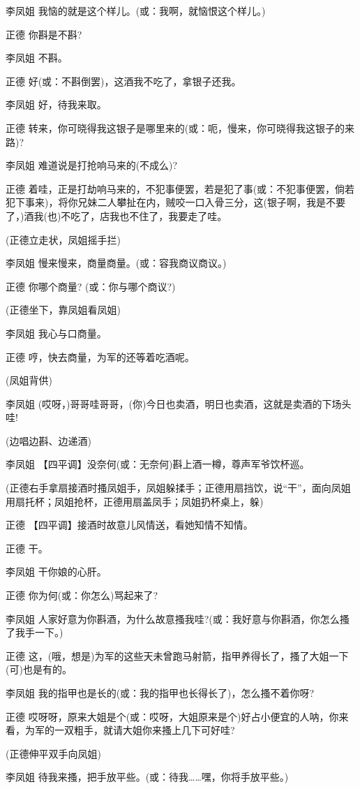 李凤姐 我恼的就是这个样儿。(或：我啊，就恼恨这个样儿。)

正德 你斟是不斟?

李凤姐 不斟。

正德 好(或：不斟倒罢)，这酒我不吃了，拿银子还我。

李凤姐 好，待我来取。

正德
转来，你可晓得我这银子是哪里来的(或：呃，慢来，你可晓得我这银子的来路)?

李凤姐 难道说是打抢响马来的(不成么)?

正德
着哇，正是打劫响马来的，不犯事便罢，若是犯了事(或：不犯事便罢，倘若犯下事来)，将你兄妹二人攀扯在内，贼咬一口入骨三分，这(银子啊，我是不要了，)酒我(也)不吃了，店我也不住了，我要走了哇。

(正德立走状，凤姐摇手拦)

李凤姐 慢来慢来，商量商量。(或：容我商议商议。)

正德 你哪个商量? (或：你与哪个商议?)

(正德坐下，靠凤姐看凤姐)

李凤姐 我心与口商量。

正德 哼，快去商量，为军的还等着吃酒呢。

(凤姐背供)

李凤姐
(哎呀，)哥哥哇哥哥，(你)今日也卖酒，明日也卖酒，这就是卖酒的下场头哇!

(边唱边斟、边递酒)

李凤姐 【四平调】没奈何(或：无奈何)斟上酒一樽，尊声军爷饮杯巡。

(正德右手拿扇接酒时搔凤姐手，凤姐躲揉手；正德用扇挡饮，说``干''，面向凤姐用扇托杯；凤姐抢杯，正德用扇盖凤手；凤姐扔杯桌上，躲)

正德 【四平调】接酒时故意儿风情送，看她知情不知情。

正德 干。

李凤姐 干你娘的心肝。

正德 你为何(或：你怎么)骂起来了?

李凤姐
人家好意为你斟酒，为什么故意搔我哇?(或：我好意与你斟酒，你怎么搔了我手一下。)

正德
这，(哦，想是)为军的这些天未曾跑马射箭，指甲养得长了，搔了大姐一下(可)也是有的。

李凤姐 我的指甲也是长的(或：我的指甲也长得长了)，怎么搔不着你呀?

正德
哎呀呀，原来大姐是个(或：哎呀，大姐原来是个)好占小便宜的人呐，你来看，为军的一双粗手，就请大姐你来搔上几下可好哇?

(正德伸平双手向凤姐)

李凤姐
待我来搔，把手放平些。(或：待我\ldots{}\ldots{}嘿，你将手放平些。)


